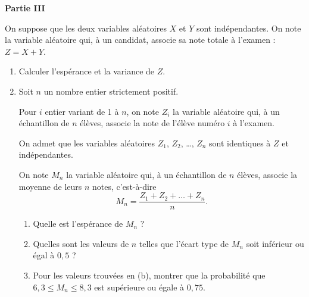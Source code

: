 \medskip

\textbf{\large Partie III}

\medskip

On suppose que les deux variables aléatoires $X$ et $Y$ sont indépendantes. On note la variable aléatoire qui, à un candidat, associe sa note totale à l’examen : $Z=X+Y$.

\begin{enumerate}
	\item Calculer l’espérance et la variance de $Z$.
	\item Soit $n$ un nombre entier strictement positif.
	
	Pour $i$ entier variant de 1 à $n$, on note $Z_i$ la variable aléatoire qui, à un échantillon de $n$ élèves, associe la note de l’élève numéro $i$ à l’examen.
	
	On admet que les variables aléatoires $Z_1$, $Z_2$, \ldots, $Z_n$ sont identiques à $Z$ et indépendantes.
	
	\smallskip
	
	On note $M_n$ la variable aléatoire qui, à un échantillon de $n$ élèves, associe la moyenne de leurs $n$ notes, c’est-à-dire \[ M_n = \frac{Z_1+Z_2+\ldots+Z_n}{n}. \]
	\begin{enumerate}
		\item Quelle est l’espérance de $M_n$ ?
		\item Quelles sont les valeurs de $n$ telles que l’écart type de $M_n$ soit inférieur ou égal à $0,5$ ?
		\item Pour les valeurs trouvées en (b), montrer que la probabilité que $6,3 \leqslant M_n \leqslant 8,3$ est supérieure ou égale à $0,75$.
	\end{enumerate}
\end{enumerate}